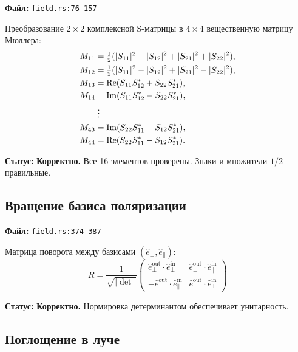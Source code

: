 \documentclass[12pt,a4paper]{article}
\begin{document}
\textbf{Файл:} \texttt{field.rs:76--157}

Преобразование $2\times 2$ комплексной S-матрицы в $4\times 4$ вещественную матрицу Мюллера:
\begin{align}
  M_{11} &= \tfrac{1}{2}(|S_{11}|^2 + |S_{12}|^2 + |S_{21}|^2 + |S_{22}|^2), \\
  M_{12} &= \tfrac{1}{2}(|S_{11}|^2 - |S_{12}|^2 + |S_{21}|^2 - |S_{22}|^2), \\
  M_{13} &= \mathrm{Re}(S_{11}S_{12}^* + S_{22}S_{21}^*), \\
  M_{14} &= \mathrm{Im}(S_{11}S_{12}^* - S_{22}S_{21}^*), \\
  &\;\vdots \notag \\
  M_{43} &= \mathrm{Im}(S_{22}S_{11}^* - S_{12}S_{21}^*), \\
  M_{44} &= \mathrm{Re}(S_{22}S_{11}^* - S_{12}S_{21}^*).
\end{align}

\textbf{Статус:} \textcolor{green!50!black}{\textbf{Корректно.}}
Все 16 элементов проверены. Знаки и множители $1/2$ правильные.

\subsection{Вращение базиса поляризации}

\textbf{Файл:} \texttt{field.rs:374--387}

Матрица поворота между базисами $(\hat{e}_\perp, \hat{e}_\parallel)$:
\[
  R = \frac{1}{\sqrt{|\det|}}
  \begin{pmatrix}
    \hat{e}_\perp^{\mathrm{out}} \cdot \hat{e}_\perp^{\mathrm{in}} &
    \hat{e}_\perp^{\mathrm{out}} \cdot \hat{e}_\parallel^{\mathrm{in}} \\
    -\hat{e}_\perp^{\mathrm{out}} \cdot \hat{e}_\parallel^{\mathrm{in}} &
    \hat{e}_\perp^{\mathrm{out}} \cdot \hat{e}_\perp^{\mathrm{in}}
  \end{pmatrix}
\]

\textbf{Статус:} \textcolor{green!50!black}{\textbf{Корректно.}}
Нормировка детерминантом обеспечивает унитарность.

\subsection{Поглощение в луче}
\end{document}
